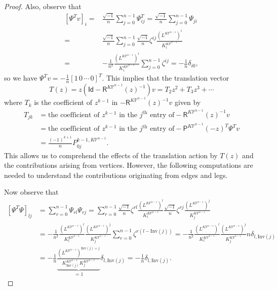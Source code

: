 \documentclass[12pt]{amsart}
\numberwithin{equation}{section}
\newcommand{\KP}{K\mathbb{P}}
\begin{document}
\begin{proof}
Also, observe that 
\begin{equation}\label{eq:contproofeq4}
\begin{split}
{\left[ \Psi^Tv\right]}_i
=&\frac{\sqrt{-1}}{n}\sum_{j=0}^{n-1}\Psi_{ij}^T=\frac{\sqrt{-1}}{n}\sum_{j=0}^{n-1}\Psi_{ji}\\
=&\frac{\sqrt{-1}}{n}\sum_{j=0}^{n-1}\frac{\sqrt{-1}}{n}\zeta^{ij}\frac{(L^{\KP^{n-1}})^i}{K^{\KP^{n-1}}_i}\\
=&-\frac{1}{n^2}\frac{(L^{\KP^{n-1}})^i}{K^{\KP^{n-1}}_i}\sum_{j=0}^{n-1}\zeta^{ij}=-\frac{1}{n}\delta_{i0},
\end{split}
\end{equation}
so we have $\Psi^Tv=-\frac{1}{n}\left[1\,0\,\cdots\,0\right]^T$. This implies that the translation vector
\begin{equation}\label{eq:contproofeq5}
T(z)=z\left(\mathsf{Id}-\mathsf{R}^{\KP^{n-1}}(z)^{-1}\right)v=T_2z^2+T_3z^3+\cdots
\end{equation}
where $T_k$ is the coefficient of $z^{k-1}$ in $-\mathsf{R}^{\KP^{n-1}}(z)^{-1}v$ given by 
\begin{equation}\label{eq:contproofeq6}
\begin{split}
 T_{jk}
 &=\text{the coefficient of $z^{k-1}$  in the $j^{\text{th}}$ entry of}-\mathsf{R}^{\KP^{n-1}}(z)^{-1}v\\
 &=\text{the coefficient of $z^{k-1}$  in the $j^{\text{th}}$ entry of} -\mathsf{P}^{\KP^{n-1}}(-z)^T\Psi^Tv\\
 &=\frac{(-1)^{k+1}}{n}P_{0j}^{k-1,\KP^{n-1}}.
\end{split}
\end{equation}
This allows us to comprehend the effects of the translation action by $T(z)$ and the contributions arising from vertices. However, the following computations are needed to understand the contributions originating from edges and legs.

Now observe that
\begin{equation}\label{eq:contproofeq8}
\begin{split}
{\left[\Psi^T \Psi\right]}_{l j}
&=
\sum_{r=0}^{n-1} \Psi_{r l} \Psi_{r j}=\sum_{r=0}^{n-1} \frac{\sqrt{-1}}{n}\zeta^{r l} \frac{(L^{\KP^{n-1}})^{l}}{K^{\KP^{n-1}}_{l}} \frac{\sqrt{-1}}{n}\zeta^{r j} \frac{(L^{\KP^{n-1}})^{j}}{K^{\KP^{n-1}}_{j}}\\
&=
-\frac{1}{n^2}\frac{(L^{\KP^{n-1}})^{l}}{K^{\KP^{n-1}}_{l}}\frac{(L^{\KP^{n-1}})^{j}}{K^{\KP^{n-1}}_{j}}\sum_{r=0}^{n-1}\zeta^{r(l-\mathrm{Inv}(j))}=-\frac{1}{n^2}\frac{(L^{\KP^{n-1}})^{l}}{K^{\KP^{n-1}}_{l}}\frac{(L^{\KP^{n-1}})^{j}}{K^{\KP^{n-1}}_{j}}n\delta_{l,\mathrm{Inv}(j)}\\
&=
-\frac{1}{n}\underbrace{\frac{(L^{\KP^{n-1}})^{\mathrm{Inv}(j)+j}}{K^{\KP^{n-1}}_{\mathrm{Inv}(j)}K^{\KP^{n-1}}_j}}_{=1}\delta_{l,\mathrm{Inv}(j)}=-\frac{1}{n}\delta_{l,\mathrm{Inv}(j)}.
\end{split}
\end{equation}


\end{proof}
\end{document}
